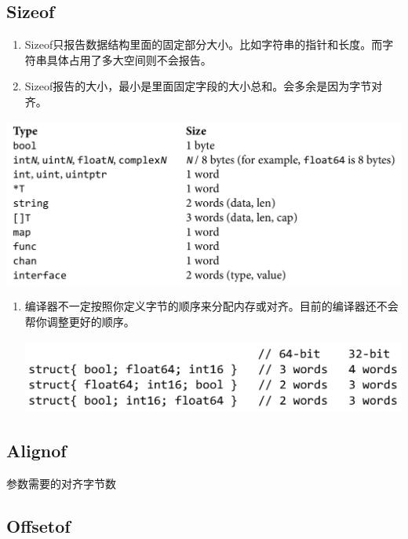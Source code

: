 \hypertarget{sizeof}{%
\subsection{Sizeof}\label{sizeof}}

\begin{enumerate}
\tightlist
\item
  Sizeof只报告数据结构里面的固定部分大小。比如字符串的指针和长度。而字符串具体占用了多大空间则不会报告。
\item
  Sizeof报告的大小，最小是里面固定字段的大小总和。会多余是因为字节对齐。
\end{enumerate}

\includegraphics[width=0.8\linewidth]{./ch13/unsafe.Sizeof,_Alignof,_and_Offsetof/screenshot_2019-10-14_08-49-08.png}

\begin{enumerate}
\item
  编译器不一定按照你定义字节的顺序来分配内存或对齐。目前的编译器还不会帮你调整更好的顺序。

  \includegraphics[width=0.8\linewidth]{./ch13/unsafe.Sizeof,_Alignof,_and_Offsetof/screenshot_2019-10-14_08-51-47.png}
\end{enumerate}

\hypertarget{alignof}{%
\subsection{Alignof}\label{alignof}}

参数需要的对齐字节数

\hypertarget{offsetof}{%
\subsection{Offsetof}\label{offsetof}}

